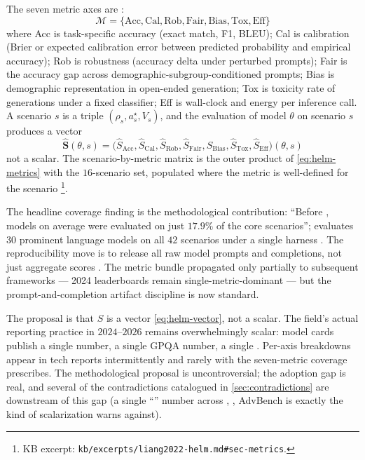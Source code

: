 The seven metric axes are
\citep[\S{}sec-metrics]{liang2022-helm}:
\begin{equation}
\mathcal{M} = \{
  \text{Acc}, \text{Cal}, \text{Rob}, \text{Fair}, \text{Bias},
  \text{Tox}, \text{Eff}
\}
\label{eq:helm-metrics}
\end{equation}
where Acc is task-specific accuracy (exact match, F1, BLEU); Cal is
calibration (Brier or expected calibration error between predicted
probability and empirical accuracy); Rob is robustness (accuracy
delta under perturbed prompts); Fair is the accuracy gap across
demographic-subgroup-conditioned prompts; Bias is demographic
representation in open-ended generation; Tox is toxicity rate of
generations under a fixed classifier; Eff is wall-clock and energy
per inference call. A scenario $s$ is a triple
$(\rho_s, a^\star_s, V_s)$, and the  evaluation of model
$\theta$ on scenario $s$ produces a vector
\begin{equation}
\hat{\mathbf{S}}(\theta, s) =
  \big(\hat{S}_{\text{Acc}}, \hat{S}_{\text{Cal}}, \hat{S}_{\text{Rob}},
       \hat{S}_{\text{Fair}}, \hat{S}_{\text{Bias}},
       \hat{S}_{\text{Tox}}, \hat{S}_{\text{Eff}}\big)(\theta, s)
\label{eq:helm-vector}
\end{equation}
not a scalar. The scenario-by-metric matrix is the outer product of
\eqref{eq:helm-metrics} with the $16$-scenario set, populated where
the metric is well-defined for the scenario%
\footnote{KB excerpt: \nolinkurl{kb/excerpts/liang2022-helm.md#sec-metrics}.}.

The headline coverage finding is the methodological contribution:
``Before , models on average were evaluated on just $17.9\%$ of
the core  scenarios'';  evaluates $30$ prominent language
models on all $42$ scenarios under a single harness
\citep[\S{}sec-coverage]{liang2022-helm}. The reproducibility move
is to release all raw model prompts and completions, not just
aggregate scores \citep[\S{}sec-output-discipline]{liang2022-helm}.
The metric bundle propagated only partially to subsequent frameworks
--- 2024 leaderboards remain single-metric-dominant --- but the
prompt-and-completion artifact discipline is now standard.

\begin{contradiction}
The  proposal is that $\hat{S}$ is a vector
\eqref{eq:helm-vector}, not a scalar. The field's actual reporting
practice in $2024$--$2026$ remains overwhelmingly scalar: model cards
publish a single  number, a single GPQA number, a single
 . Per-axis breakdowns appear in tech reports
intermittently and rarely with the seven-metric coverage 
prescribes. The methodological proposal is uncontroversial; the
adoption gap is real, and several of the contradictions catalogued
in \cref{sec:contradictions} are downstream of this gap (a single
``'' number across , , AdvBench is
exactly the kind of scalarization  warns against).
\end{contradiction}

